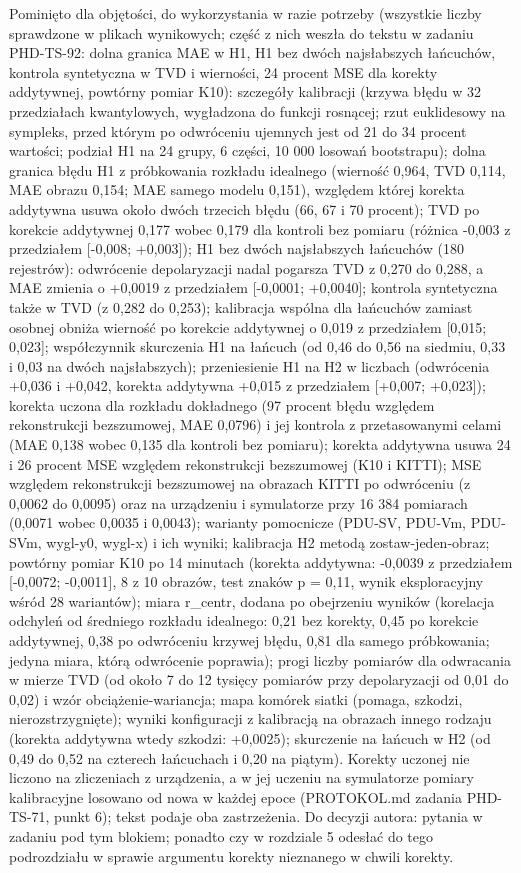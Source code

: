 {Pominięto dla objętości, do wykorzystania w razie potrzeby (wszystkie liczby sprawdzone w plikach wynikowych; część z nich weszła do tekstu w zadaniu PHD-TS-92: dolna granica MAE w H1, H1 bez dwóch najsłabszych łańcuchów, kontrola syntetyczna w TVD i wierności, 24 procent MSE dla korekty addytywnej, powtórny pomiar K10): szczegóły kalibracji (krzywa błędu w 32 przedziałach kwantylowych, wygładzona do funkcji rosnącej; rzut euklidesowy na sympleks, przed którym po odwróceniu ujemnych jest od 21 do 34 procent wartości; podział H1 na 24 grupy, 6 części, 10 000 losowań bootstrapu); dolna granica błędu H1 z próbkowania rozkładu idealnego (wierność 0,964, TVD 0,114, MAE obrazu 0,154; MAE samego modelu 0,151), względem której korekta addytywna usuwa około dwóch trzecich błędu (66, 67 i 70 procent); TVD po korekcie addytywnej 0,177 wobec 0,179 dla kontroli bez pomiaru (różnica -0,003 z przedziałem [-0,008; +0,003]); H1 bez dwóch najsłabszych łańcuchów (180 rejestrów): odwrócenie depolaryzacji nadal pogarsza TVD z 0,270 do 0,288, a MAE zmienia o +0,0019 z przedziałem [-0,0001; +0,0040]; kontrola syntetyczna także w TVD (z 0,282 do 0,253); kalibracja wspólna dla łańcuchów zamiast osobnej obniża wierność po korekcie addytywnej o 0,019 z przedziałem [0,015; 0,023]; współczynnik skurczenia H1 na łańcuch (od 0,46 do 0,56 na siedmiu, 0,33 i 0,03 na dwóch najsłabszych); przeniesienie H1 na H2 w liczbach (odwrócenia +0,036 i +0,042, korekta addytywna +0,015 z przedziałem [+0,007; +0,023]); korekta uczona dla rozkładu dokładnego (97 procent błędu względem rekonstrukcji bezszumowej, MAE 0,0796) i jej kontrola z przetasowanymi celami (MAE 0,138 wobec 0,135 dla kontroli bez pomiaru); korekta addytywna usuwa 24 i 26 procent MSE względem rekonstrukcji bezszumowej (K10 i KITTI); MSE względem rekonstrukcji bezszumowej na obrazach KITTI po odwróceniu (z 0,0062 do 0,0095) oraz na urządzeniu i symulatorze przy 16 384 pomiarach (0,0071 wobec 0,0035 i 0,0043); warianty pomocnicze (PDU-SV, PDU-Vm, PDU-SVm, wygl-y0, wygl-x) i ich wyniki; kalibracja H2 metodą zostaw-jeden-obraz; powtórny pomiar K10 po 14 minutach (korekta addytywna: -0,0039 z przedziałem [-0,0072; -0,0011], 8 z 10 obrazów, test znaków p = 0,11, wynik eksploracyjny wśród 28 wariantów); miara r_centr, dodana po obejrzeniu wyników (korelacja odchyleń od średniego rozkładu idealnego: 0,21 bez korekty, 0,45 po korekcie addytywnej, 0,38 po odwróceniu krzywej błędu, 0,81 dla samego próbkowania; jedyna miara, którą odwrócenie poprawia); progi liczby pomiarów dla odwracania w mierze TVD (od około 7 do 12 tysięcy pomiarów przy depolaryzacji od 0,01 do 0,02) i wzór obciążenie-wariancja; mapa komórek siatki (pomaga, szkodzi, nierozstrzygnięte); wyniki konfiguracji z kalibracją na obrazach innego rodzaju (korekta addytywna wtedy szkodzi: +0,0025); skurczenie na łańcuch w H2 (od 0,49 do 0,52 na czterech łańcuchach i 0,20 na piątym).
Korekty uczonej nie liczono na zliczeniach z urządzenia, a w jej uczeniu na symulatorze pomiary kalibracyjne losowano od nowa w każdej epoce (PROTOKOL.md zadania PHD-TS-71, punkt 6); tekst podaje oba zastrzeżenia.
Do decyzji autora: pytania w zadaniu pod tym blokiem; ponadto czy w rozdziale 5 odesłać do tego podrozdziału w sprawie argumentu korekty nieznanego w chwili korekty.
}
